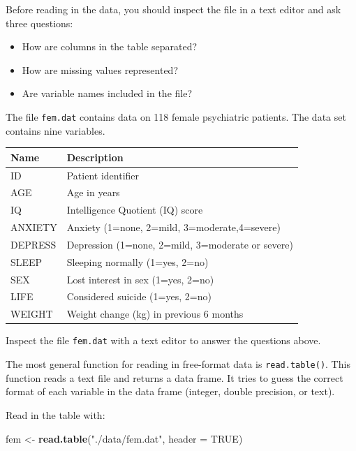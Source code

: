 \documentclass[
]{book}
\newenvironment{Shaded}{\begin{snugshade}}{\end{snugshade}}
\newcommand{\AttributeTok}[1]{\textcolor[rgb]{0.13,0.29,0.53}{#1}}
\newcommand{\ConstantTok}[1]{\textcolor[rgb]{0.56,0.35,0.01}{#1}}
\newcommand{\FunctionTok}[1]{\textcolor[rgb]{0.13,0.29,0.53}{\textbf{#1}}}
\newcommand{\NormalTok}[1]{#1}
\newcommand{\OtherTok}[1]{\textcolor[rgb]{0.56,0.35,0.01}{#1}}
\newcommand{\StringTok}[1]{\textcolor[rgb]{0.31,0.60,0.02}{#1}}
\newcounter{none} %
\providecommand{\tightlist}{%
  \setlength{\itemsep}{0pt}\setlength{\parskip}{0pt}}
\begin{document}
Before reading in the data, you should inspect the file in a text
editor and ask three questions:

\begin{itemize}
\tightlist
\item
  How are columns in the table separated?
\item
  How are missing values represented?
\item
  Are variable names included in the file?
\end{itemize}

The file \texttt{fem.dat} contains data on 118 female psychiatric
patients. The data set contains nine variables.

{\def\LTcaptype{none} %
\begin{longtable}[]{@{}ll@{}}
\toprule\noalign{}
Name & Description \\
\midrule\noalign{}
\endhead
\bottomrule\noalign{}
\endlastfoot
ID & Patient identifier \\
AGE & Age in years \\
IQ & Intelligence Quotient (IQ) score \\
ANXIETY & Anxiety (1=none, 2=mild, 3=moderate,4=severe) \\
DEPRESS & Depression (1=none, 2=mild, 3=moderate or severe) \\
SLEEP & Sleeping normally (1=yes, 2=no) \\
SEX & Lost interest in sex (1=yes, 2=no) \\
LIFE & Considered suicide (1=yes, 2=no) \\
WEIGHT & Weight change (kg) in previous 6 months \\
\end{longtable}
}

Inspect the file \texttt{fem.dat} with a text editor to answer the
questions above.

The most general function for reading in free-format data is
\texttt{read.table()}. This function reads a text file and returns a
data frame. It tries to guess the correct format of each variable in
the data frame (integer, double precision, or text).

Read in the table with:

\begin{Shaded}
\begin{Highlighting}[]
\NormalTok{fem }\OtherTok{\textless{}{-}} \FunctionTok{read.table}\NormalTok{(}\StringTok{"./data/fem.dat"}\NormalTok{, }\AttributeTok{header =} \ConstantTok{TRUE}\NormalTok{)}
\end{Highlighting}
\end{Shaded}
\end{document}

